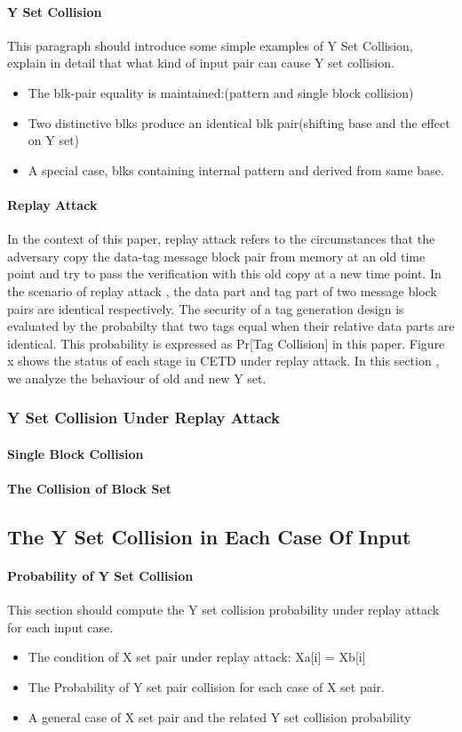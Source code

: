 \documentclass{article}
\begin{document}
\paragraph{Y Set Collision}
This paragraph should introduce some simple examples of Y Set Collision, explain in detail that what kind of input pair can cause Y set collision.
\begin{itemize}
	\item The blk-pair equality is maintained:(pattern and single block collision)
	\item Two distinctive blks produce an identical blk pair(shifting base and the effect on Y set)
	\item A special case, blks containing internal pattern and derived from same base. 
\end{itemize}
\paragraph{Replay Attack}
In the context of this paper, replay attack refers to the circumstances that the adversary copy the data-tag message block pair from memory at an old time point and try to pass the verification with this old copy at a new time point. In the scenario of replay attack , the data part and tag part of two message block pairs are identical respectively. The security of a tag generation design is evaluated by the probabilty that two tags equal when their relative data parts are identical. This probability is expressed as Pr[Tag Collision] in this paper. 
Figure x shows the status of each stage in CETD under replay attack. In this section , we analyze the behaviour of old and new Y set.
\subsubsection{Y Set Collision Under Replay Attack}
\paragraph{Single Block Collision}

\paragraph{The Collision of Block Set}

\subsection{The Y Set Collision in Each Case Of Input}
\paragraph{Probability of Y Set Collision}
This section should compute the Y set collision probability under replay attack for each input case.
\begin{itemize}
	\item The condition of X set pair under replay attack: Xa[i] = Xb[i]
	\item The Probability of Y set pair collision for each case of X set pair.
	\item A general case of X set pair and the related Y set collision probability
\end{itemize}
\end{document}
